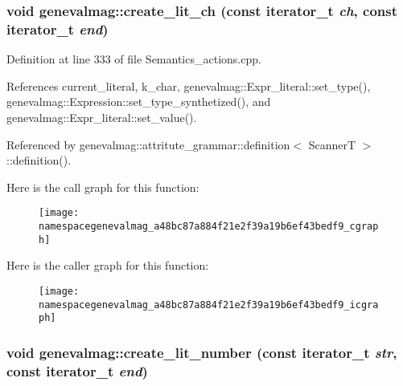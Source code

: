 \hypertarget{namespacegenevalmag_a48bc87a884f21e2f39a19b6ef43bedf9}{
\subsubsection[{create\_\-lit\_\-ch}]{\setlength{\rightskip}{0pt plus 5cm}void genevalmag::create\_\-lit\_\-ch (const iterator\_\-t {\em ch}, \/  const iterator\_\-t {\em end})}}
\label{namespacegenevalmag_a48bc87a884f21e2f39a19b6ef43bedf9}


Definition at line 333 of file Semantics\_\-actions.cpp.



References current\_\-literal, k\_\-char, genevalmag::Expr\_\-literal::set\_\-type(), genevalmag::Expression::set\_\-type\_\-synthetized(), and genevalmag::Expr\_\-literal::set\_\-value().



Referenced by genevalmag::attritute\_\-grammar::definition$<$ ScannerT $>$::definition().



Here is the call graph for this function:\nopagebreak
\begin{figure}[H]
\begin{center}
\leavevmode
\texttt{[image: namespacegenevalmag\_a48bc87a884f21e2f39a19b6ef43bedf9\_cgraph]}
\end{center}
\end{figure}




Here is the caller graph for this function:\nopagebreak
\begin{figure}[H]
\begin{center}
\leavevmode
\texttt{[image: namespacegenevalmag\_a48bc87a884f21e2f39a19b6ef43bedf9\_icgraph]}
\end{center}
\end{figure}


\hypertarget{namespacegenevalmag_a380b107e4dbce952517d6aac470e7ce7}{
\subsubsection[{create\_\-lit\_\-number}]{\setlength{\rightskip}{0pt plus 5cm}void genevalmag::create\_\-lit\_\-number (const iterator\_\-t {\em str}, \/  const iterator\_\-t {\em end})}}
\label{namespacegenevalmag_a380b107e4dbce952517d6aac470e7ce7}


